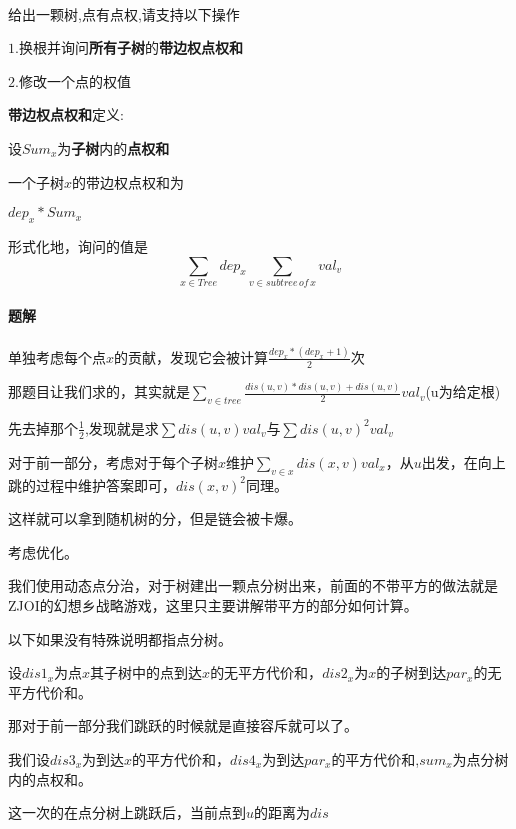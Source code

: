 \documentclass[UTF8]{ctexart}
\begin{document}
\paragraph{}
给出一颗树,点有点权,请支持以下操作

$1.$换根并询问\textbf{所有子树}的\textbf{带边权点权和}

$2.$修改一个点的权值

\textbf{带边权点权和}定义:

设$Sum_x$为\textbf{子树}内的\textbf{点权和}

一个子树$x$的带边权点权和为

$dep_x*Sum_x$

形式化地，询问的值是
$$
    \sum\limits_{x\in Tree} dep_x\sum\limits_{v\in subtree\, of\,x}{val_v}
$$

\paragraph{题解}
\paragraph{}

单独考虑每个点$x$的贡献，发现它会被计算$\frac {dep_x*(dep_x+1)}2$次

那题目让我们求的，其实就是$\sum\limits_{v\in tree} \frac {dis(u,v)*dis(u,v)+dis(u,v)}2 val_v$(u为给定根)

先去掉那个$\frac 12$,发现就是求$\sum dis(u,v) val_v$与$\sum dis(u,v)^2 val_v$

对于前一部分，考虑对于每个子树$x$维护$\sum\limits_{v\in x} dis(x,v) val_x$，从$u$出发，在向上跳的过程中维护答案即可，$dis(x,v)^2$同理。

这样就可以拿到随机树的分，但是链会被卡爆。

考虑优化。

我们使用动态点分治，对于树建出一颗点分树出来，前面的不带平方的做法就是ZJOI的幻想乡战略游戏，这里只主要讲解带平方的部分如何计算。

以下如果没有特殊说明都指点分树。

设$dis1_x$为点$x$其子树中的点到达$x$的无平方代价和，$dis2_x$为$x$的子树到达$par_x$的无平方代价和。

那对于前一部分我们跳跃的时候就是直接容斥就可以了。

我们设$dis3_x$为到达$x$的平方代价和，$dis4_x$为到达$par_x$的平方代价和,$sum_x$为点分树内的点权和。

这一次的在点分树上跳跃后，当前点到$u$的距离为$dis$
\end{document}
